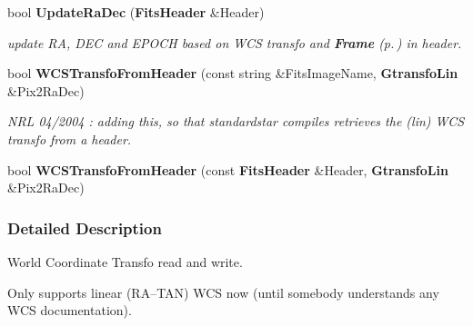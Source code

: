 \begin{CompactItemize}
\item 
{}
bool {\bf Update\-Ra\-Dec} ({\bf Fits\-Header} \&Header)\label{wcsutils_h_a24}

\begin{CompactList}\small\item\em update RA, DEC and EPOCH based on WCS transfo and {\bf Frame} {\rm (p.\,\pageref{class_frame})} in header.\item\end{CompactList}\item 
{}
bool {\bf WCSTransfo\-From\-Header} (const string \&Fits\-Image\-Name, {\bf Gtransfo\-Lin} \&Pix2Ra\-Dec)\label{wcsutils_h_a25}

\begin{CompactList}\small\item\em NRL 04/2004 : adding this, so that standardstar compiles retrieves the (lin) WCS transfo from a header.\item\end{CompactList}\item 
{}
bool {\bf WCSTransfo\-From\-Header} (const {\bf Fits\-Header} \&Header, {\bf Gtransfo\-Lin} \&Pix2Ra\-Dec)\label{wcsutils_h_a26}

\end{CompactItemize}


\subsubsection{Detailed Description}
World Coordinate Transfo read and write.

 Only supports linear (RA--TAN) WCS now (until somebody understands any WCS documentation).

